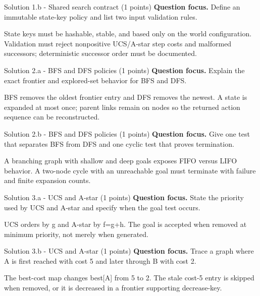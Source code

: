 \documentclass[aspectratio=169,11pt]{beamer}
\begin{document}
\begin{frame}{Solution 1.b - Shared search contract (1 points)}
\small
\textbf{Question focus.} Define an immutable state-key policy and list two input validation rules.

\vspace{0.25cm}
\answerlabel State keys must be hashable, stable, and based only on the world configuration. Validation must reject nonpositive UCS/A-star step costs and malformed successors; deterministic successor order must be documented.
\end{frame}

\begin{frame}{Solution 2.a - BFS and DFS policies (1 points)}
\small
\textbf{Question focus.} Explain the exact frontier and explored-set behavior for BFS and DFS.

\vspace{0.25cm}
\answerlabel BFS removes the oldest frontier entry and DFS removes the newest. A state is expanded at most once; parent links remain on nodes so the returned action sequence can be reconstructed.
\end{frame}

\begin{frame}{Solution 2.b - BFS and DFS policies (1 points)}
\small
\textbf{Question focus.} Give one test that separates BFS from DFS and one cyclic test that proves termination.

\vspace{0.25cm}
\answerlabel A branching graph with shallow and deep goals exposes FIFO versus LIFO behavior. A two-node cycle with an unreachable goal must terminate with failure and finite expansion counts.
\end{frame}

\begin{frame}{Solution 3.a - UCS and A-star (1 points)}
\small
\textbf{Question focus.} State the priority used by UCS and A-star and specify when the goal test occurs.

\vspace{0.25cm}
\answerlabel UCS orders by g and A-star by f=g+h. The goal is accepted when removed at minimum priority, not merely when generated.
\end{frame}

\begin{frame}{Solution 3.b - UCS and A-star (1 points)}
\small
\textbf{Question focus.} Trace a graph where A is first reached with cost 5 and later through B with cost 2.

\vspace{0.25cm}
\answerlabel The best-cost map changes best[A] from 5 to 2. The stale cost-5 entry is skipped when removed, or it is decreased in a frontier supporting decrease-key.
\end{frame}
\end{document}
